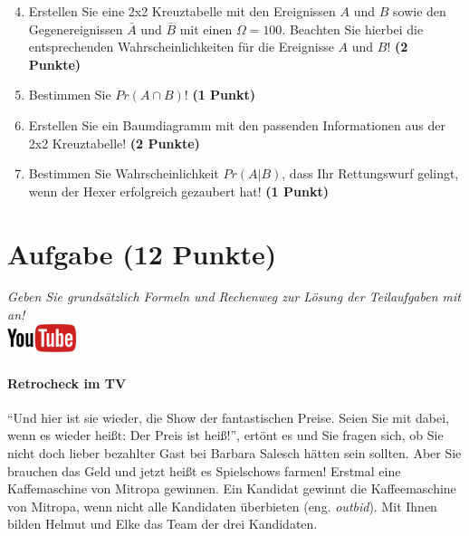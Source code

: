 \documentclass[a4paper, 10pt]{scrartcl}\usepackage[]{graphicx}\usepackage[]{xcolor}
\begin{document}
\begin{enumerate}
  \setcounter{enumi}{3}
\item Erstellen Sie eine 2x2 Kreuztabelle mit den Ereignissen $A$ und $B$
  sowie den Gegenereignissen $\bar{A}$ und $\bar{B}$ mit einen
  $\Omega = 100$. Beachten Sie hierbei die entsprechenden
  Wahrscheinlichkeiten f{\"u}r die Ereignisse $A$ und $B$! \textbf{(2 Punkte)}
\item Bestimmen Sie $Pr(A \cap B)$! \textbf{(1 Punkt)}
\item Erstellen Sie ein Baumdiagramm mit den passenden Informationen aus der 2x2
  Kreuztabelle! \textbf{(2 Punkte)}
\item Bestimmen Sie Wahrscheinlichkeit $Pr(A|B)$, dass Ihr Rettungswurf gelingt, wenn
  der Hexer erfolgreich gezaubert hat! \textbf{(1 Punkt)}
\end{enumerate}

  
\clearpage

\section{Aufgabe \hfill (12 Punkte)}

\textit{Geben Sie grunds{\"a}tzlich Formeln und Rechenweg zur L{\"o}sung der
  Teilaufgaben mit an!} \\[1Ex]

\hfill\href{https://youtu.be/9DQKaXdxT_g}{\includegraphics[width =
  2cm]{img/youtube}} %
\hspace{2Ex}

\paragraph{Retrocheck im TV}



"`Und hier ist sie wieder, die Show der fantastischen Preise. Seien Sie mit
dabei, wenn es wieder hei{\ss}t: Der Preis ist hei{\ss}!"', ert{\"o}nt es und Sie
fragen sich, ob Sie nicht doch lieber bezahlter Gast bei Barbara Salesch
h{\"a}tten sein sollten. Aber Sie brauchen das Geld und jetzt hei{\ss}t es
Spielschows farmen! Erstmal eine Kaffemaschine von Mitropa
gewinnen. Ein Kandidat gewinnt die Kaffeemaschine von Mitropa, wenn nicht alle
Kandidaten {\"u}berbieten (eng. \textit{outbid}). Mit Ihnen bilden
Helmut und Elke das Team der drei Kandidaten.
\end{document}
